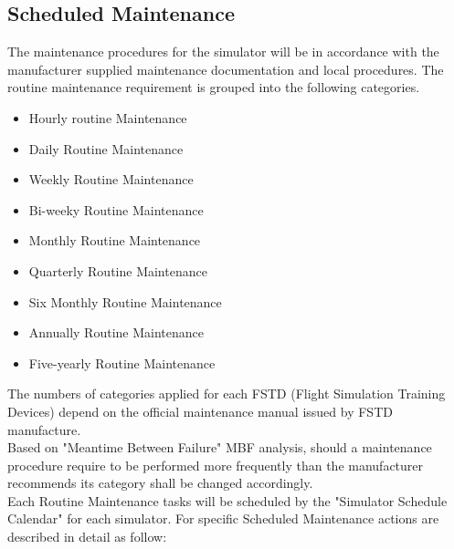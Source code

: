     \subsection{Scheduled Maintenance}
        The maintenance procedures for the simulator will be in accordance with the manufacturer supplied maintenance documentation 
        and local procedures. The routine maintenance requirement is grouped into the following categories.
        \begin{itemize}
            \item Hourly routine Maintenance
            \item Daily Routine Maintenance
            \item Weekly Routine Maintenance
            \item Bi-weeky Routine Maintenance
            \item Monthly Routine Maintenance
            \item Quarterly Routine Maintenance
            \item Six Monthly Routine Maintenance
            \item Annually Routine Maintenance
            \item Five-yearly Routine Maintenance
        \end{itemize}
        The numbers of categories applied for each FSTD (Flight Simulation Training Devices) depend on the official maintenance manual 
        issued by FSTD manufacture. \\ 
        \vspace{3mm}
        Based on "Meantime Between Failure" MBF analysis, should a maintenance procedure require to be performed more frequently than the 
        manufacturer recommends its category shall be changed accordingly. \\ 
        \vspace{3mm}
        Each Routine Maintenance tasks will be scheduled by the "Simulator Schedule Calendar" for each simulator. For specific Scheduled 
        Maintenance actions are described in detail as follow:
